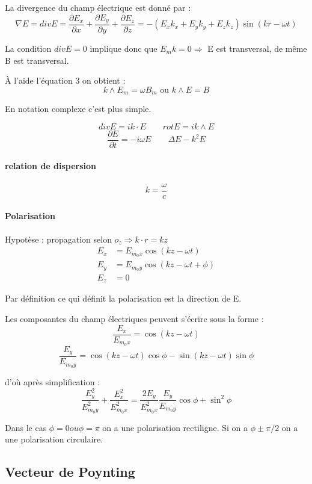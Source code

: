 \documentclass[12pt,a4paper]{report}
\begin{document}
La divergence du champ électrique est donné par :
\[
	\nabla E = div E = \dfrac{\partial E_x}{\partial x} + \dfrac{\partial E_y}{\partial y} + \dfrac{\partial E_z}{\partial z} = -(E_x k_x + E_y k_y + E_z k_z) \sin(kr - \omega t)
\]

La condition \(div E = 0\) implique donc que \(E_m k = 0 \Rightarrow \) E est transversal, de même B est transversal.

À l'aide l'équation 3 on obtient :
\[
	k \wedge E_m = \omega B_m \text{ ou } k \wedge E = B 
\]

En notation complexe c'est plus simple.

\[
	div E = ik \cdot E \quad \quad rot E = ik \wedge E
\]
\[
	\dfrac{\partial E}{\partial t} = -i \omega E \quad \quad \Delta E - k^2 E
\]

\paragraph{relation de dispersion}

\[
	k = \dfrac{\omega}{c}
\]

\paragraph{Polarisation}

Hypotèse : propagation selon \(o_z \Rightarrow k\cdot r = kz\)
\begin{align*}
	E_x &= E_{m_0x} \cos (kz - \omega t)\\
	E_y &= E_{m_0y} \cos (kz - \omega t + \phi)\\
	E_z &= 0
\end{align*}

Par définition ce qui définit la polarisation est la direction de E.

Les composantes du champ électriques peuvent s'écrire sous la forme :
\[
	\dfrac{E_x}{E_{m_0x}} = \cos (kz - \omega t)
\]
\[
	\dfrac{E_y}{E_{m_0y}} = \cos (kz - \omega t) \cos \phi -\sin (kz - \omega t) \sin \phi
\]

d'où après simplification : 
\[
	\dfrac{E_y^2}{E^2_{m_0y}} + \dfrac{E_x^2}{E^2_{m_0x}} = \dfrac{2 E_y}{E^2_{m_0x}} \dfrac{E_y}{E_{m_0y}}\cos \phi + \sin^2 \phi
\]

Dans le cas \(\phi = 0 ou \phi = \pi\) on a une polarisation rectiligne.
Si on a \(\phi \pm \pi/2\) on a une polarisation circulaire.

\subsection{Vecteur de Poynting}
\end{document}
